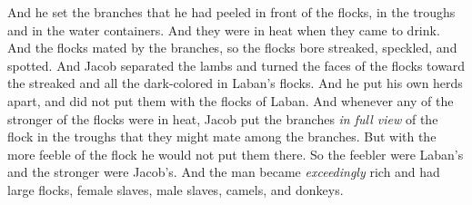 \begin{biblechapter}
\verse And he set the branches that he had peeled in front of the flocks, in the troughs and in the water containers. And they were in heat when they came to drink.
\verse And the flocks mated by the branches, so the flocks bore streaked, speckled, and spotted.
\verse And Jacob separated the lambs and turned the faces of the flocks toward the streaked and all the dark-colored in Laban’s flocks. And he put his own herds apart, and did not put them with the flocks of Laban.
\verse And whenever any of the stronger of the flocks were in heat, Jacob put the branches \textit{in full view} of the flock in the troughs that they might mate among the branches.
\verse But with the more feeble of the flock he would not put them there. So the feebler were Laban’s and the stronger were Jacob’s.
\verse And the man became \textit{exceedingly} rich and had large flocks, female slaves, male slaves, camels, and donkeys.
\end{biblechapter}


